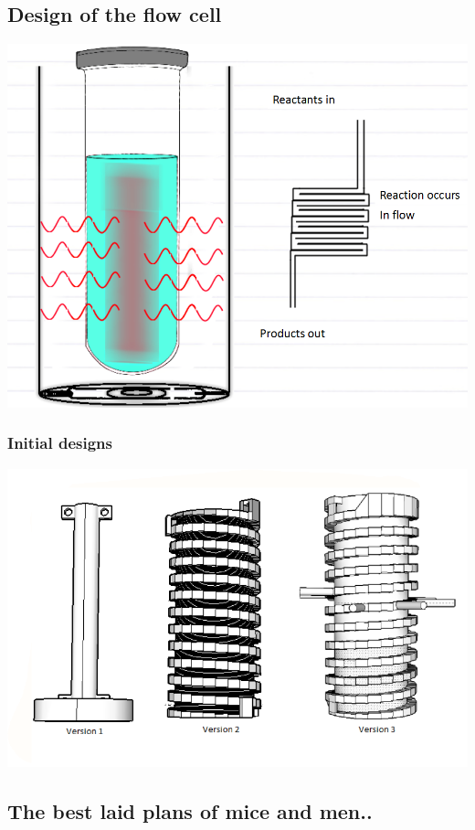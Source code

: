 \documentclass[10pt, compress]{beamer}
\begin{document}
\subsection{Design of the flow cell}
\begin{frame}
\includegraphics[width=\textwidth]{reacflow.PNG}
\end{frame}

\begin{frame}
\frametitle{Initial designs}
\includegraphics[width=\textwidth]{initdesign.PNG}
\end{frame}

\subsection{The best laid plans of mice and men..}
\end{document}
